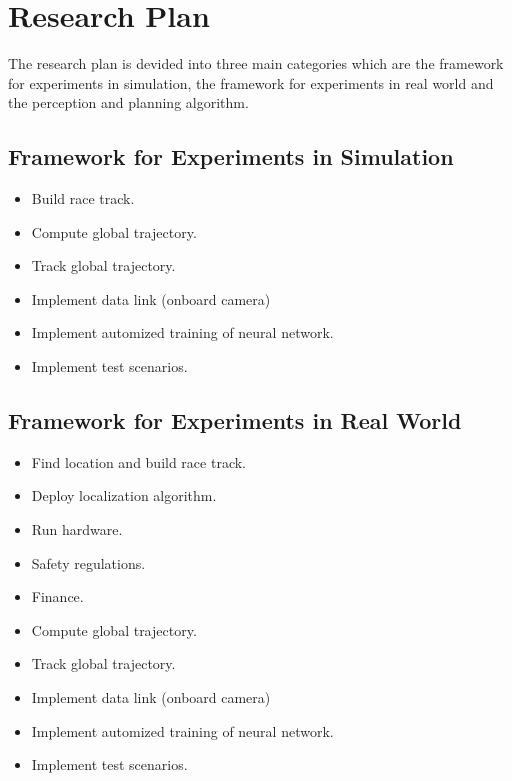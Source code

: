 
\section{Research Plan}

The research plan is devided into
three main categories which are the framework for experiments in simulation,
the framework for experiments in real world and
the perception and planning algorithm.

\subsection{Framework for Experiments in Simulation}

\begin{itemize}
    \item Build race track.
    \item Compute global trajectory.
    \item Track global trajectory.
    \item Implement data link (onboard camera)
    \item Implement automized training of neural network.
    \item Implement test scenarios.
\end{itemize}


\subsection{Framework for Experiments in Real World}

\begin{itemize}
    \item Find location and build race track.
    \item Deploy localization algorithm.
    \item Run hardware.
    \item Safety regulations.
    \item Finance.
    \item Compute global trajectory.
    \item Track global trajectory.
    \item Implement data link (onboard camera)
    \item Implement automized training of neural network.
    \item Implement test scenarios.
\end{itemize}
    

